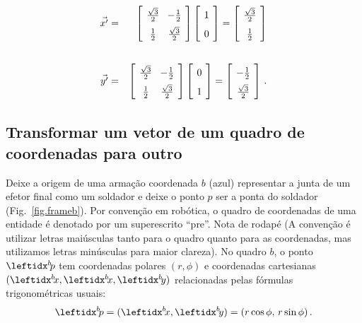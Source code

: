 \begin{eqnarray*}
\vec{x'}&=&\left[\spacearray\begin{array}{cc}\frac{\sqrt{3}}{2}&-\frac{1}{2}\\\frac{1}{2}&\frac{\sqrt{3}}{2}\end{array}\right]
\left[\spacearray\begin{array}{c}1\\0\end{array}\right]=
\left[\spacearray\begin{array}{c}\frac{\sqrt{3}}{2}\\\frac{1}{2}\end{array}\right]\\
\,\\
\vec{y'}&=&\left[\spacearray\begin{array}{cc}\frac{\sqrt{3}}{2}&-\frac{1}{2}\\\frac{1}{2}&\frac{\sqrt{3}}{2}\end{array}\right]
\left[\spacearray\begin{array}{c}0\\1\end{array}\right]=
\left[\spacearray\begin{array}{c}-\frac{1}{2}\\\frac{\sqrt{3}}{2}\end{array}\right]\,.
\end{eqnarray*}

\subsection{Transformar um vetor de um quadro de coordenadas para outro}

Deixe a origem de uma armação coordenada $b$ (azul) representar a junta de um efetor final como um soldador e deixe o ponto $p$ ser a ponta do soldador (Fig.~\ref{fig.frameb}). Por convenção em robótica, o quadro de coordenadas de uma entidade é denotado por um superescrito ``pre''. Nota de rodapé (A convenção é utilizar letras maiúsculas tanto para o quadro quanto para as coordenadas, mas utilizamos letras minúsculas para maior clareza).  No quadro $b$, o ponto $\bp$ tem coordenadas polares $(r,\phi)$ e coordenadas cartesianas $(\bx,\bx,\by)$ relacionadas pelas fórmulas trigonométricas usuais:
\[
\bp = (\bx,\by) = (r\cos\phi,\, r\sin\phi)\,.
\]

